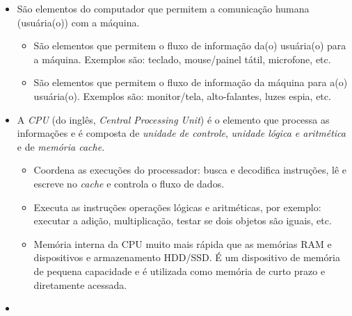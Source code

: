 \ifisbook
\newpage
\fi

\begin{itemize}
\item {}

  São elementos do computador que permitem a comunicação humana (usuária(o)) com a máquina.

  \begin{itemize}
  \item {}

    São elementos que permitem o fluxo de informação da(o) usuária(o) para a máquina. Exemplos são: teclado, mouse/painel tátil, microfone, etc.

  \item {}

    São elementos que permitem o fluxo de informação da máquina para a(o) usuária(o). Exemplos são: monitor/tela, alto-falantes, luzes espia, etc.
  \end{itemize}

\item {}

  A \emph{CPU} (do inglês, \textit{Central Processing Unit}) é o elemento que processa as informações e é composta de \emph{unidade de controle}, \emph{unidade lógica e aritmética} e de \emph{memória cache}.

  \begin{itemize}
  \item {}

    Coordena as execuções do processador: busca e decodifica instruções, lê e escreve no \textit{cache} e controla o fluxo de dados.

  \item {}

    Executa as instruções operações lógicas e aritméticas, por exemplo: executar a adição, multiplicação, testar se dois objetos são iguais, etc.

  \item {}

    Memória interna da CPU muito mais rápida que as memórias RAM e dispositivos e armazenamento HDD/SSD. É um dispositivo de memória de pequena capacidade e é utilizada como memória de curto prazo e diretamente acessada.
  \end{itemize}

\item {}


\end{itemize}
